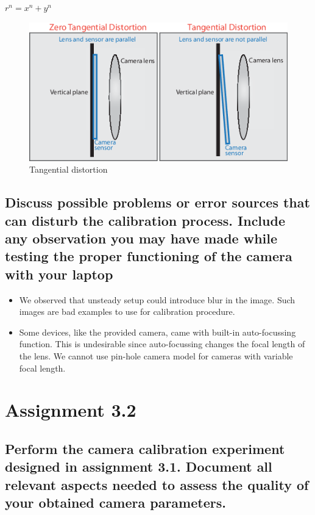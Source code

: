 $r^n = x^n + y^n$

\begin{figure}[H]
	\centering
	\includegraphics[width=0.5\linewidth]{graphics/calibration_tangentialdistortion}
	\caption{Tangential distortion}
	\label{fig:calibrationtangentialdistortion}
\end{figure}


\subsection{Discuss possible problems or error sources that can disturb the calibration process. Include any observation you may have made while testing the proper functioning of the camera with your laptop}
\begin{itemize}
\item We observed that unsteady setup could introduce blur in the image. Such images are bad examples to use for calibration procedure.
\item Some devices, like the provided camera, came with built-in auto-focussing function. This is undesirable since auto-focussing changes the focal length of the lens. We cannot use pin-hole camera model for cameras with variable focal length.
\end{itemize}



\section{Assignment 3.2}
\subsection*{Perform the camera calibration experiment designed in assignment 3.1. Document all relevant aspects needed to assess the quality of your obtained camera parameters.}

	

